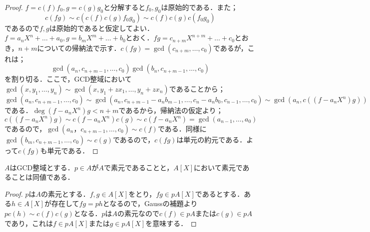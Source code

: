 \begin{proof}
	$f=c(f)f_0,g=c(g)g_0$と分解すると$f_0,g_0$は原始的である．また；
	\[c(fg)\sim c(c(f)c(g)f_0g_0)\sim c(f)c(g)c(f_0g_0)\]
	であるので$f,g$は原始的であると仮定してよい．$f=a_nX^n+\dots+a_0,g=b_mX^m+\dots+b_0$とおく．$fg=c_{n+m}X^{n+m}+\dots+c_0$とおき，$n+m$についての帰納法で示す．$c(fg)=\gcd(c_{n+m},\dots,c_0)$であるが，これは；
	\[\gcd(a_n,c_{n+m-1},\dots, c_0)\gcd(b_n,c_{n+m-1},\dots,c_0)\]
	を割り切る．ここで，GCD整域において$\gcd(x,y_1,\dots,y_n)\sim\gcd(x,y_1+zx_1,\dots,y_n+zx_n)$であることから；
	\[\gcd(a_n,c_{n+m-1},\dots,c_0)\sim\gcd(a_n,c_{n+m-1}-a_nb_{m-1},\dots,c_n-a_nb_0,c_{n-1},\dots,c_0)\sim\gcd(a_n, c((f-a_nX^n)g))\]
	である．$\deg(f-a_nX^n)g<n+m$であるから，帰納法の仮定より；
	\[c((f-a_nX^n)g)\sim c(f-a_nX^n)c(g)\sim c(f-a_nX^n)=\gcd(a_{n-1},\dots,a_0)\]
	であるので，$\gcd(a_n，c_{n+m-1},\dots,c_0)\sim c(f)$である．同様に$\gcd(b_m,c_{n+m-1},\dots,c_0)\sim c(g)$であるので，$c(fg)$は単元の約元である．よって$c(fg)$も単元である．
\end{proof}

%

\begin{prop}
	$A$はGCD整域とする．$p\in A$が$A$で素元であることと，$A[X]$において素元であることは同値である．
\end{prop}

\begin{proof}
	$p$は$A$の素元とする．$f,g\in A[X]$をとり，$fg\in pA[X]$であるとする．ある$h\in A[X]$が存在して$fg=ph$となるので，Gaussの補題より$pc(h)\sim c(f)c(g)$となる．$p$は$A$の素元なので$c(f)\in pA$または$c(g)\in pA$であり，これは$f\in pA[X]$または$g\in pA[X]$を意味する．
\end{proof}

